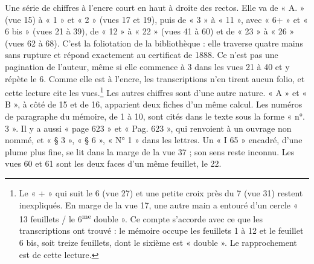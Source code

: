 \documentclass[11pt,a4paper]{article}
\begin{document}
Une série de chiffres à l'encre court en haut à droite des rectos. Elle va de
« A. » (vue 15) à « 1 » et « 2 » (vues 17 et 19), puis de « 3 » à « 11 », avec
« 6+ » et « 6 bis » (vues 21 à 39), de « 12 » à « 22 » (vues 41 à 60) et de
« 23 » à « 26 » (vues 62 à 68). C'est la foliotation de la bibliothèque : elle
traverse quatre mains sans rupture et répond exactement au certificat de 1888.
Ce n'est pas une pagination de l'auteur, même si elle commence à 3 dans les vues
21 à 40 et y répète le 6. Comme elle est à l'encre, les transcriptions n'en
tirent aucun folio, et cette lecture cite les vues.\footnote{Le « + » qui suit
le 6 (vue 27) et une petite croix près du 7 (vue 31) restent inexpliqués. En
marge de la vue 17, une autre main a entouré d'un cercle « 13 feuillets / le
6\textsuperscript{me} double ». Ce compte s'accorde avec ce que les
transcriptions ont trouvé : le mémoire occupe les feuillets 1 à 12 et le
feuillet 6 bis, soit treize feuillets, dont le sixième est « double ». Le
rapprochement est de cette lecture.} Les autres chiffres sont d'une autre
nature. « A » et « B », à côté de 15 et de 16, apparient deux fiches d'un même
calcul. Les numéros de paragraphe du mémoire, de 1 à 10, sont cités dans le
texte sous la forme « n°. 3 ». Il y a aussi « page 623 » et « Pag. 623 », qui
renvoient à un ouvrage non nommé, et « § 3 », « § 6 », « N° 1 » dans les
lettres. Un « I 65 » encadré, d'une plume plus fine, se lit dans la marge de la
vue 37 ; son sens reste inconnu. Les vues 60 et 61 sont les deux faces d'un même
feuillet, le 22.
\end{document}
